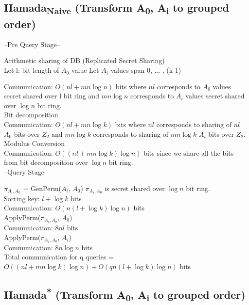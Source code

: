 \subsection{Hamada\textsubscript{Naive} (Transform A\textsubscript{0}, A\textsubscript{i} to grouped order)}

--Pre Query Stage--

\textbullet{} Arithmetic sharing of DB (Replicated Secret Sharing) \\
Let l: bit length of $A_0$ value
Let $A_i$ values span 0, ... , (k-1)

Communication: $O(nl + mn\log n)$ bits where $nl$ corresponds to $A_0$ values secret shared over l bit ring and $mn\log n$ corresponds to $A_i$ values secret shared over $\log n$ bit ring. \\

\textbullet{} Bit decomposition \\
Communication: $O(nl + mn\log k)$ bits where $nl$ corresponds to sharing of $nl$ $A_0$ bits over $Z_2$ and $mn\log k$ corresponds to sharing of $mn\log k$ $A_i$ bits over $Z_2$. \\

\textbullet{} Modulus Conversion \\
Communication: $O((nl + mn\log k)\log n)$ bits since we share all the bits from bit decomposition over $\log n$ bit ring.\\

--Query Stage--

\textbullet{} $\pi_{A_i,A_0}$ = GenPerm($A_i$, $A_0$)
$\pi_{A_i,A_0}$ is secret shared over $\log n$ bit ring. \\

Sorting key: $l + \log k$ bits \\
Communication:  $O(n(l + \log k)\log n)$ bits \\

\textbullet{} ApplyPerm($\pi_{A_i,A_0}$, $A_0$) \\
Communication: $8nl$ bits \\

\textbullet{} ApplyPerm($\pi_{A_i,A_0}$, $A_i$) \\
Communication: $8n\log n$ bits \\

Total communication for q queries =  $O((nl + mn\log k)\log n) + O(qn(l + \log k)\log n)$ bits

\subsection{Hamada\textsuperscript{*} (Transform A\textsubscript{0}, A\textsubscript{i} to grouped order)}


